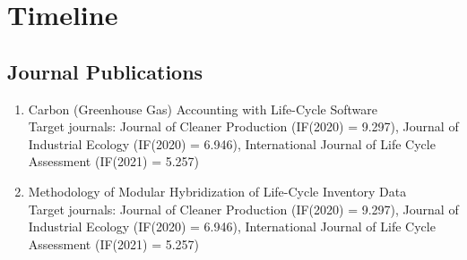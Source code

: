 \documentclass{article}
\begin{document}

\newpage
\section{Timeline}
    
    \subsection{Journal Publications}
    
    \begin{enumerate}
    \setcounter{enumi}{0}
        \item Carbon (Greenhouse Gas) Accounting with Life-Cycle Software \\ Target journals: Journal of Cleaner Production (IF(2020) = 9.297), Journal of Industrial Ecology (IF(2020) = 6.946), International Journal of Life Cycle Assessment (IF(2021) = 5.257)
    \end{enumerate}
    
    \begin{enumerate}
    \setcounter{enumi}{1}
        \item Methodology of Modular Hybridization of Life-Cycle Inventory Data \\ Target journals: Journal of Cleaner Production (IF(2020) = 9.297), Journal of Industrial Ecology (IF(2020) = 6.946), International Journal of Life Cycle Assessment (IF(2021) = 5.257)
    \end{enumerate}
    
\end{document}
